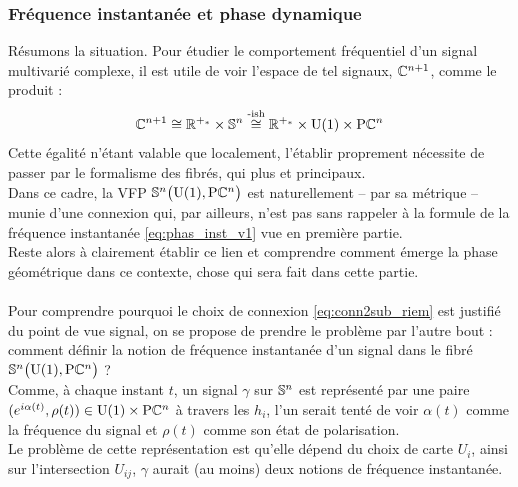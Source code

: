 \subsubsection{Fréquence instantanée et phase dynamique}

Résumons la situation. Pour étudier le comportement fréquentiel d'un signal multivarié complexe, il est utile de voir l'espace de tel signaux, $\C^{n+1}$, comme le produit :
\[\C^{n+1} \cong \R^{+_*} \times \S{n} \overset{\text{-ish}}{\cong} \R^{+_*} \times \U{1} \times \PC{n}\]
Cette égalité n'étant valable que localement, l'établir proprement nécessite de passer par le formalisme des fibrés, qui plus et principaux.
\\
Dans ce cadre, la VFP $\VFP$ est naturellement -- par sa métrique -- munie d'une connexion qui, par ailleurs, n'est pas sans rappeler à la formule de la fréquence instantanée \eqref{eq:phas_inst_v1} vue en première partie.
\\
Reste alors à clairement établir ce lien et comprendre comment émerge la phase géométrique dans ce contexte, chose qui sera fait dans cette partie.
\\ \\





Pour comprendre pourquoi le choix de connexion \eqref{eq:conn2sub_riem} est justifié du point de vue signal, on se propose de prendre le problème par l'autre bout : comment définir la notion de fréquence instantanée d'un signal dans le fibré $\VFP$ ?
\\
 
Comme, à chaque instant $t$, un signal $\gamma$ sur $\S{n}$ est représenté par une paire $(e^{i\alpha(t)}, \rho(t))\in\U{1}\times\PC{n}$ à travers les $h_i$,  l'un serait tenté de voir $\alpha(t)$ comme la fréquence du signal et $\rho(t)$ comme son état de polarisation.
\\
Le problème de cette représentation est qu'elle dépend du choix de carte $U_i$, ainsi sur l'intersection $U_{ij}$, $\gamma$ aurait (au moins) deux notions de fréquence instantanée.
\\

